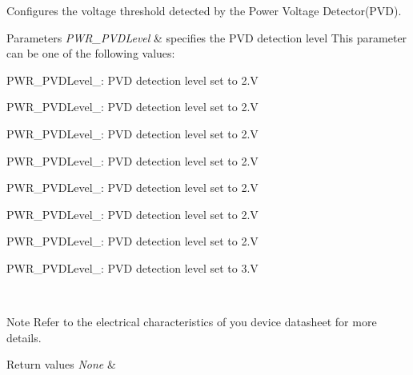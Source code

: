 Configures the voltage threshold detected by the Power Voltage Detector(\+P\+V\+D). 


\begin{DoxyParams}{Parameters}
{\em P\+W\+R\+\_\+\+P\+V\+D\+Level} & specifies the P\+V\+D detection level This parameter can be one of the following values\+: \begin{DoxyItemize}
\item P\+W\+R\+\_\+\+P\+V\+D\+Level\+\_\+: P\+V\+D detection level set to 2.\+V \item P\+W\+R\+\_\+\+P\+V\+D\+Level\+\_\+: P\+V\+D detection level set to 2.\+V \item P\+W\+R\+\_\+\+P\+V\+D\+Level\+\_\+: P\+V\+D detection level set to 2.\+V \item P\+W\+R\+\_\+\+P\+V\+D\+Level\+\_\+: P\+V\+D detection level set to 2.\+V \item P\+W\+R\+\_\+\+P\+V\+D\+Level\+\_\+: P\+V\+D detection level set to 2.\+V \item P\+W\+R\+\_\+\+P\+V\+D\+Level\+\_\+: P\+V\+D detection level set to 2.\+V \item P\+W\+R\+\_\+\+P\+V\+D\+Level\+\_\+: P\+V\+D detection level set to 2.\+V \item P\+W\+R\+\_\+\+P\+V\+D\+Level\+\_\+: P\+V\+D detection level set to 3.\+V \end{DoxyItemize}
\\
\hline
\end{DoxyParams}
\begin{DoxyNote}{Note}
Refer to the electrical characteristics of you device datasheet for more details. 
\end{DoxyNote}

\begin{DoxyRetVals}{Return values}
{\em None} & \\
\hline
\end{DoxyRetVals}
